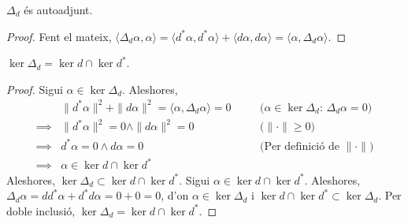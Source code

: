 \begin{corolari}
    $\Delta_{d}$ és autoadjunt.
    \begin{proof}
        Fent el mateix, $\langle\Delta_{d}\alpha,\alpha\rangle=\langle d^{*}\alpha,d^{*}\alpha\rangle+\langle d\alpha,d\alpha\rangle=\langle\alpha,\Delta_{d}\alpha\rangle$.
    \end{proof}
\end{corolari}
\begin{corolari}
    $\ker{\Delta_{d}}=\ker{d}\cap\ker{d^{*}}$.
    \begin{proof}
        Sigui $\alpha\in\ker{\Delta_{d}}$. Aleshores,
        \begin{align*}
            &\|d^{*}\alpha\|^{2}+\|d\alpha\|^{2}
            =\langle\alpha,\Delta_{d}\alpha\rangle
            =0
            &\quad&\textrm{($\alpha\in\ker{\Delta_{d}}$: $\Delta_{d}\alpha=0$)}\\
            \implies
            &\|d^{*}\alpha\|^{2}=0\land\|d\alpha\|^{2}=0
            &\quad&\textrm{($\|\cdot\|\geq0$)}\\
            \implies
            &d^{*}\alpha=0\land d\alpha=0
            &\quad&\textrm{(Per definició de $\|\cdot\|$)}\\
            \implies
            &\alpha\in\ker{d}\cap\ker{d^{*}}
        \end{align*}
        Aleshores, $\ker{\Delta_{d}}\subset\ker{d}\cap\ker{d^{*}}$. Sigui $\alpha\in\ker{d}\cap\ker{d^{*}}$. Aleshores, $\Delta_{d}\alpha=dd^{*}\alpha+d^{*}d\alpha=0+0=0$, d'on $\alpha\in\ker{\Delta_{d}}$ i $\ker{d}\cap\ker{d^{*}}\subset\ker{\Delta_{d}}$. Per doble inclusió, $\ker{\Delta_{d}}=\ker{d}\cap\ker{d^{*}}$.
    \end{proof}
\end{corolari}
